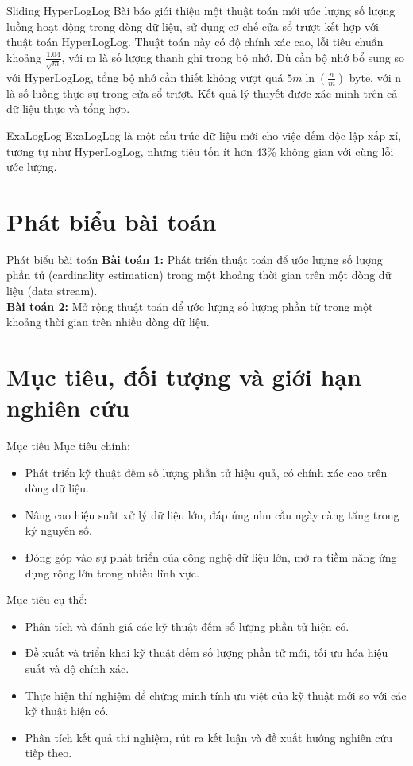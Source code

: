 \documentclass[10pt]{beamer}
\begin{document}
\begin{frame}[fragile]{Sliding HyperLogLog \cite{chabchoub2010sliding}}
  Bài báo giới thiệu một thuật toán mới ước lượng số lượng luồng hoạt động trong dòng dữ liệu, sử dụng cơ chế cửa sổ trượt kết hợp với 
  thuật toán HyperLogLog. Thuật toán này có độ chính xác cao, lỗi tiêu chuẩn khoảng $\frac{1.04}{\sqrt{m}}$, với m là số lượng thanh ghi trong bộ nhớ. Dù cần bộ nhớ bổ sung 
  so với HyperLogLog, tổng bộ nhớ cần thiết không vượt quá $5m\ln(\frac{n}{m})$ byte, với n là số luồng thực sự trong cửa sổ trượt. Kết quả lý thuyết được xác minh trên cả dữ liệu thực 
  và tổng hợp.
\end{frame}
\begin{frame}[fragile]{ExaLogLog \cite{ertl2024exaloglog}}
  ExaLogLog là một cấu trúc dữ liệu mới cho việc đếm độc lập xấp xỉ, tương tự như HyperLogLog, nhưng tiêu tốn ít hơn 43\% không gian với cùng lỗi ước lượng.
\end{frame}
\section{Phát biểu bài toán}
\begin{frame}[fragile]{Phát biểu bài toán}
\textbf{Bài toán 1:} Phát triển thuật toán để ước lượng số lượng phần tử (cardinality estimation) trong một khoảng thời gian trên một dòng dữ liệu (data stream).\\
\textbf{Bài toán 2:} Mở rộng thuật toán để ước lượng số lượng phần tử trong một khoảng thời gian trên nhiều dòng dữ liệu.
\end{frame}
\section{Mục tiêu, đối tượng và giới hạn nghiên cứu}

\begin{frame}{Mục tiêu}
  Mục tiêu chính:
  \begin{itemize}
      \item Phát triển kỹ thuật đếm số lượng phần tử hiệu quả, có chính xác cao trên dòng dữ liệu.
      \item Nâng cao hiệu suất xử lý dữ liệu lớn, đáp ứng nhu cầu ngày càng tăng trong kỷ nguyên số.
      \item Đóng góp vào sự phát triển của công nghệ dữ liệu lớn, mở ra tiềm năng ứng dụng rộng lớn trong nhiều lĩnh vực.
  \end{itemize}
  Mục tiêu cụ thể:
  \begin{itemize}
      \item Phân tích và đánh giá các kỹ thuật đếm số lượng phần tử hiện có.
      \item Đề xuất và triển khai kỹ thuật đếm số lượng phần tử mới, tối ưu hóa hiệu suất và độ chính xác.
      \item Thực hiện thí nghiệm để chứng minh tính ưu việt của kỹ thuật mới so với các kỹ thuật hiện có.
      \item Phân tích kết quả thí nghiệm, rút ra kết luận và đề xuất hướng nghiên cứu tiếp theo.
  \end{itemize}
\end{frame}
\end{document}
